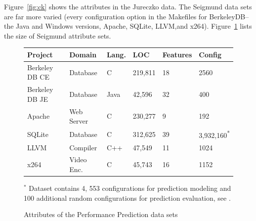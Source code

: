 \documentclass[conference]{IEEEtran}
\newcommand{\fig}[1]{Figure~\ref{fig:#1}}
\begin{document}
  \fig{ck} shows the attributes in the Jureczko data.
  The Seigmund data sets are far more varied (every configuration option in the Makefiles
  for BerkeleyDB-- the Java  and  Windows  versions,  Apache,  SQLite,  LLVM,and x264).
  \fig{cpm} lists the size of Seigmund attribute sets.

 

\begin{figure}[!hbp]
  \renewcommand{\baselinestretch}{1}\begin{center}
{\scriptsize
\begin{tabular}{llllll}
  \hline
  \rowcolor{lightgray}
Project & Domain & Lang. & LOC & Features & Config\\\hline

Berkeley DB CE & Database & C & 219,811 & 18 & 2560\\

Berkeley DB JE & Database & Java & 42,596 & 32  & 400\\

Apache & Web Server & C & 230,277 & 9 & 192\\

SQLite & Database & C & 312,625 & 39 & 3,932,160\textsuperscript{*}\\

LLVM & Compiler & C++ & 47,549 & 11 & 1024\\

x264 & Video Enc. & C& 45,743 & 16 & 1152\\\hline
\end{tabular}}\par\medskip

{ \footnotesize $^*$ Dataset contains 4, 553 configurations for prediction modeling and 100 additional random configurations for prediction evaluation, see \cite{vapp}.}
\end{center}

\caption{Attributes of the Performance Prediction data sets}\label{fig:cpm}
\end{figure}



  
  
\end{document}
